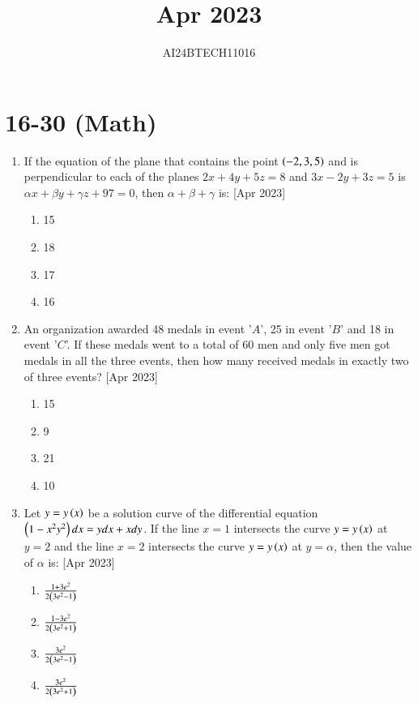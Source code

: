\documentclass[journal]{IEEEtran}
\begin{document}

\title{Apr 2023}
\author{AI24BTECH11016}
{\let\newpage\relax\maketitle}

\renewcommand{\thefigure}{\theenumi}
\renewcommand{\thetable}{\theenumi}
\setlength{\intextsep}{10pt} %

\section{16-30 (Math)}
\begin{enumerate}
	\item
	If the equation of the plane that contains the point $\left(-2, 3, 5\right)$ and is perpendicular to each of the planes $2x + 4y + 5z = 8$ and $3x - 2y + 3z = 5$ is $\alpha x + \beta y + \gamma z + 97 = 0$, then $\alpha + \beta + \gamma$ is:
	\hfill [Apr 2023]
		\begin{enumerate}
			\item 15
			\item 18
			\item 17
			\item 16
		\end{enumerate}

	\item
	An organization awarded 48 medals in event '$A$', 25 in event '$B$' and 18 in event '$C$'. If these medals went to a total of 60 men and only five men got medals in all the three events, then how many received medals in exactly two of three events?
	\hfill [Apr 2023]
		\begin{enumerate}
			\item 15
			\item 9
			\item 21
			\item 10
		\end{enumerate}

	\item
	Let $y = y\left(x\right)$ be a solution curve of the differential equation $\left(1 - x^{2}y^{2}\right)dx = y dx + x dy$. If the line $x = 1$ intersects the curve $y = y\left(x\right)$ at $y = 2$ and the line $x = 2$ intersects the curve $y = y\left(x\right)$ at $y = \alpha$, then the value of $\alpha$ is:
	\hfill [Apr 2023]
		\begin{enumerate}
			\item $\frac{1+3e^{2}}{2\left(3e^{2}-1\right)}$
			\item $\frac{1-3e^{2}}{2\left(3e^{2}+1\right)}$
			\item $\frac{3e^{2}}{2\left(3e^{2}-1\right)}$
			\item $\frac{3e^{2}}{2\left(3e^{2}+1\right)}$
		\end{enumerate}


\end{enumerate}
\end{document}
